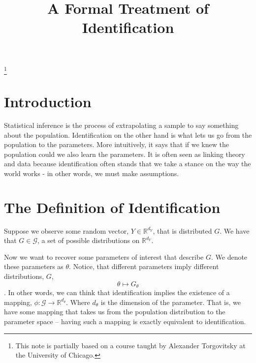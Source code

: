 \documentclass[final,pdftex]{ectaart}
\numberwithin{equation}{section}
\theoremstyle{plain}
\newcommand{\R}{\mathbb{R}}
\begin{document}
\begin{frontmatter}
\title{A Formal Treatment of Identification}

\begin{aug}
\author{ }
\footnote{This note is partially based on a course taught by Alexander Torgovitsky at the University of Chicago.}
\address{}
\end{aug}

\begin{abstract}

\end{abstract}


\end{frontmatter}

\section{Introduction}

Statistical inference is the process of extrapolating a sample to say something about the population. Identification on the other hand is what lets us go from the population to the parameters. More intuitively, it says that if we knew the population could we also learn the parameters. It is often seen as linking theory and data because identification often stands that we take a stance on the way the world works - in other words, we must make assumptions.

\section{The Definition of Identification}

Suppose we observe some random vector, $Y\in\R^{d_Y}$, that is distributed $G$. We have that $G\in\mathcal{G}$, a set of possible distributions on $\R^{d_Y}$.

Now we want to recover some parameters of interest that describe $G$. We denote these parameters as $\theta$. Notice, that different parameters imply different distributions, $G$,
$$\theta \mapsto G_\theta$$.
In other words, we can think that identification implies the existence of a mapping, $\phi: \mathcal{G} \to \R^{d_\theta}$. Where $d_\theta$ is the dimension of the parameter. That is, we have some mapping that takes us from the population distribution to the parameter space -- having such a mapping is exactly equivalent to identification.
\end{document}
